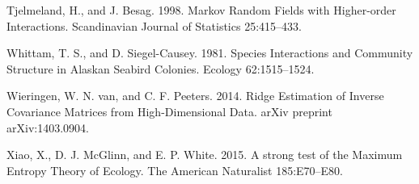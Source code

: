 \documentclass[12pt,]{article}
\begin{document}
\begin{spacing}{1.9}
\begin{flushleft}
Tjelmeland, H., and J. Besag. 1998. Markov Random Fields with
Higher-order Interactions. Scandinavian Journal of Statistics
25:415--433.

Whittam, T. S., and D. Siegel-Causey. 1981. Species Interactions and
Community Structure in Alaskan Seabird Colonies. Ecology 62:1515--1524.

Wieringen, W. N. van, and C. F. Peeters. 2014. Ridge Estimation of
Inverse Covariance Matrices from High-Dimensional Data. arXiv preprint
arXiv:1403.0904.

Xiao, X., D. J. McGlinn, and E. P. White. 2015. A strong test of the
Maximum Entropy Theory of Ecology. The American Naturalist 185:E70--E80.
\end{flushleft}
\end{spacing}
\end{document}
